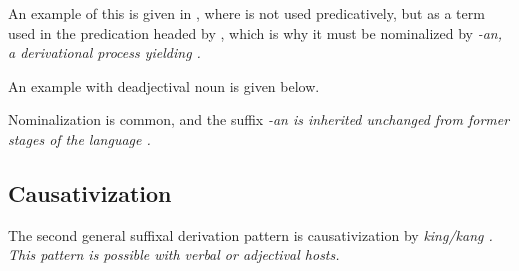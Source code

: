 
An example of this is given in , where  is not used predicatively, but as a term used in the predication headed by , which is why it must be nominalized by \em -an\em, a derivational process yielding .


An example with deadjectival noun is given below.




Nominalization is common, and the suffix \em -an \em is inherited unchanged from former stages of the language \citep{Adelaar1991}.

\subsection{Causativization}\label{sec:wofo:Causativization}
The second general suffixal derivation pattern is causativization by \em king/kang \em {}. This pattern is possible with verbal or adjectival hosts.

